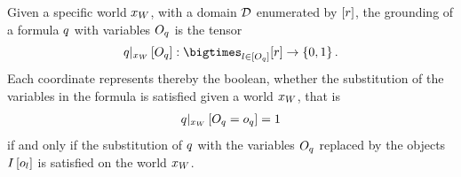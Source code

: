 \begin{definition}
    Given a specific world $x_{W}$, with a domain $\mathcal{D}$ enumerated by $[r]$, the grounding of a formula $q$ with variables $O_{q}$  is the tensor
    \begin{align*}
        \groundingofat{\folexformula}{\indvariableof{\folexformula}} :
        \bigtimes_{\indenumerator\in[\indvariableof{\folexformula}]} [\inddim] \rightarrow \ozset \, .
    \end{align*}
    Each coordinate represents thereby the boolean, whether the substitution of the variables in the formula is satisfied given a world $x_{W}$, that is
    \begin{align*}
        {q}|_{x_{W}} \left[O_{q}=o_{q}\right] = 1
    \end{align*}
    if and only if the substitution of $q$ with the variables $O_{q}$ replaced by the objects $I\left[o_{l}\right]$ is satisfied on the world $x_{W}$.
\end{definition}




%

